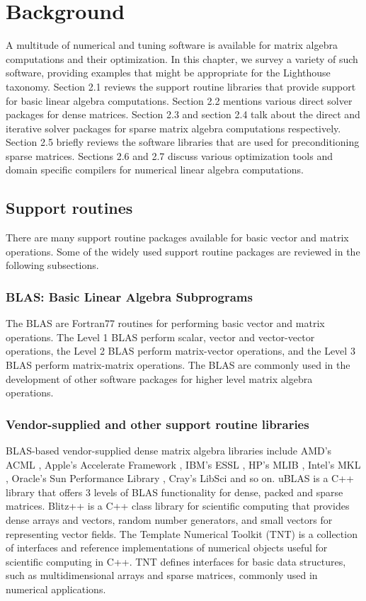 \chapter{Background}
\label{backgroundchapter}

A multitude of numerical and tuning software is available for matrix algebra computations and their optimization. In this chapter, we survey a variety of such software, providing examples that might be appropriate for the Lighthouse taxonomy. Section 2.1 reviews the support routine libraries that provide support for basic linear algebra computations. Section 2.2 mentions various direct solver packages for dense matrices. Section 2.3 and section 2.4 talk about the direct and iterative solver packages for sparse matrix algebra computations respectively. Section 2.5 briefly reviews the software libraries that are used for preconditioning sparse matrices. Sections 2.6 and 2.7 discuss various optimization tools and domain specific compilers for numerical linear algebra computations.

\section{Support routines}
There are many support routine packages available for basic vector and matrix operations. Some of the widely used support routine packages are reviewed in the following subsections.

\subsection{BLAS: Basic Linear Algebra Subprograms}
The BLAS \cite{dongarra} are Fortran77 routines for performing basic vector and matrix operations. The Level 1 BLAS perform scalar, vector and vector-vector operations, the Level 2 BLAS perform matrix-vector operations, and the Level 3 BLAS perform matrix-matrix operations. The BLAS are commonly used in the development of other software packages for higher level matrix algebra operations. 
\subsection{Vendor-supplied and other support routine libraries}
BLAS-based vendor-supplied dense matrix algebra libraries include AMD's ACML \cite{amd}, Apple's Accelerate Framework \cite{apple}, IBM's ESSL \cite{ibm}, HP's MLIB \cite{hp}, Intel's MKL \cite{intel}, Oracle's Sun Performance Library \cite{sun}, Cray's LibSci \cite{libsci} and so on. uBLAS \cite{ublas} is a C++ library that offers 3 levels of BLAS functionality for dense, packed and sparse matrices. Blitz++ \cite{blitz} is a C++ class library for scientific computing that provides dense arrays and vectors, random number generators, and small vectors for representing vector fields. The Template Numerical Toolkit (TNT) \cite{tnt} is a collection of interfaces and reference implementations of numerical objects useful for scientific computing in C++. TNT defines interfaces for basic data structures, such as multidimensional arrays and sparse matrices, commonly used in numerical applications.

